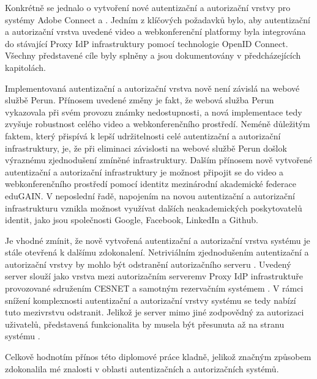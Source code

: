 \documentclass[
  printed, %
  twoside, %
  table,   %
  nolof,     %
  nolot,     %
]{fithesis3}
\begin{document}
\par 

Konkrétně se jednalo o vytvoření nové autentizační a autorizační vrstvy pro systémy Adobe Connect a . Jedním z klíčových požadavků bylo, aby autentizační a autorizační vrstva uvedené video a webkonferenční platformy byla integrována do stávající Proxy IdP infrastruktury pomocí technologie OpenID Connect. Všechny představené cíle byly splněny a jsou dokumentovány v předcházejících kapitolách. 

\par
Implementovaná autentizační a autorizační vrstva nově není závislá na webové službě Perun. Přínosem uvedené změny je fakt, že webová služba Perun vykazovala při svém provozu známky nedostupnosti, a nová implementace tedy zvyšuje robustnost celého video a webkonferenčního prostředí. Neméně důležitým faktem, který přispívá k lepší udržitelnosti celé autentizační a autorizační infrastruktury, je, že při eliminaci závislosti na webové službě Perun došlo\break k výraznému zjednodušení zmíněné infrastruktury. Dalším přínosem nově vytvořené autentizační a autorizační infrastruktury je možnost připojit se do video a webkonferenčního prostředí pomocí identit\break z mezinárodní akademické federace eduGAIN. V neposlední řadě, napojením na novou autentizační a autorizační infrastrukturu vznikla možnost využívat dalších neakademických poskytovatelů identit, jako jsou společnosti Google, Facebook, LinkedIn a Github. 

\par

Je vhodné zmínit, že nově vytvořená autentizační a autorizační vrstva systému  je stále otevřená k dalšímu zdokonalení. Netriviálním zjednodušením autentizační a autorizační vrstvy by mohlo být odstranění autorizačního serveru . Uvedený server slouží jako vrstva mezi autorizačním serverem\break v Proxy IdP infrastruktuře provozované sdružením CESNET a samotným rezervačním systémem . V rámci snížení komplexnosti autentizační a autorizační vrstvy systému  se tedy nabízí tuto mezivrstvu odstranit. Jelikož je server  mimo jiné zodpovědný za autorizaci uživatelů, představená funkcionalita by musela být přesunuta až na stranu systému . 

\par 

Celkově hodnotím přínos této diplomové práce kladně, jelikož značným způsobem zdokonalila mé znalosti v oblasti autentizačních a autorizačních systémů.
\end{document}
